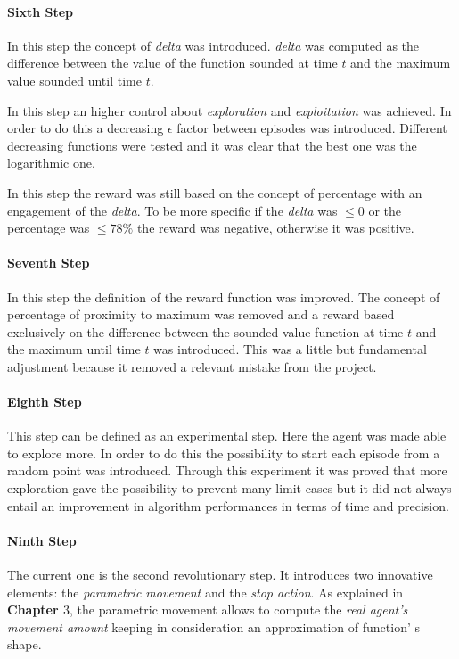 \paragraph{Sixth Step} In this step the concept of \textit{delta} was introduced. \textit{delta} was computed as the difference between the value of the function sounded at time $t$ and the maximum value sounded until time $t$. 

In this step an higher control about \textit{exploration} and \textit{exploitation} was achieved. In order to do this a decreasing $\epsilon$ factor between episodes was introduced. Different decreasing functions were tested and it was clear that the best one was the logarithmic one. 

In this step the reward was still based on the concept of percentage with an engagement of the \textit{delta}. To be more specific if the \textit{delta} was $\le 0$ or the percentage was $\le 78\%$ the reward was negative, otherwise it was positive.

\paragraph{Seventh Step} In this step the definition of the reward function was improved. The concept of percentage of proximity to maximum was removed and a reward based exclusively on the difference between the sounded value function at time $t$ and the maximum until time $t$ was introduced. This was a little but fundamental adjustment because it removed a relevant mistake from the project.

\paragraph{Eighth Step} This step can be defined as an experimental step. Here the agent was made able to explore more. In order to do this the possibility to start each episode from a random point was introduced. Through this experiment it was proved that more exploration gave the possibility to prevent many limit cases but it did not always entail an improvement in algorithm performances in terms of time and precision.

\paragraph{Ninth Step} The current one is the second revolutionary step. It introduces two innovative elements: the \textit{parametric movement} and the \textit{stop action}.
As explained in \textbf{Chapter $3$}, the parametric movement allows to compute the \textit{real agent's movement amount} keeping in consideration an approximation of function' s shape.


